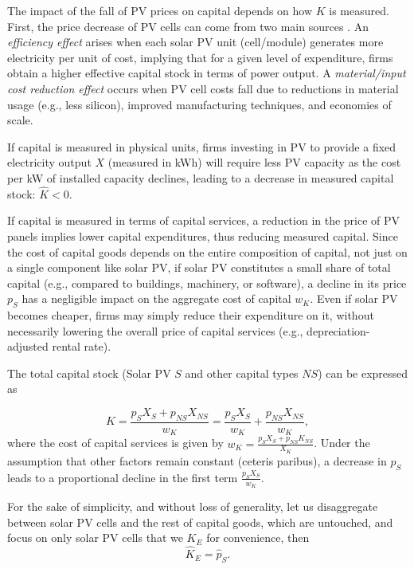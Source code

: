 \documentclass[11pt]{article}
\begin{document}
The impact of the fall of PV prices on capital depends on how $K$ is measured. First, the price decrease of PV cells can come from two main sources \citep{kavlakEvaluatingCausesCost2018}.
An \emph{efficiency effect} arises when each solar PV unit (cell/module) generates more electricity per unit of cost, implying that for a given level of expenditure, firms obtain a higher effective capital stock in terms of power output. A \emph{material/input cost reduction effect} occurs when PV cell costs fall due to reductions in material usage (e.g., less silicon), improved manufacturing techniques, and economies of scale. 

\vspace{3mm}
If capital is measured in physical units, firms investing in PV to provide a fixed electricity output $X$ (measured in kWh) will require less PV capacity as the cost per kW of installed capacity declines, leading to a decrease in measured capital stock: $\hat{K} < 0$. 

If capital is measured in terms of capital services, a reduction in the price of PV panels implies lower capital expenditures, thus reducing measured capital. Since the cost of capital goods depends on the entire composition of capital, not just on a single component like solar PV, if solar PV constitutes a small share of total capital (e.g., compared to buildings, machinery, or software), a decline in its price $p_S$ has a negligible impact on the aggregate cost of capital $w_K$. Even if solar PV becomes cheaper, firms may simply reduce their expenditure on it, without necessarily lowering the overall price of capital services (e.g., depreciation-adjusted rental rate). 

The total capital stock (Solar PV $S$ and other capital types $NS$) can be expressed as 

\begin{equation*}
    K = \frac{p_S X_S + p_{NS} X_{NS}}{w_K}=\frac{p_S X_S}{w_K}+\frac{p_{NS} X_{NS}}{w_K},
\end{equation*} where the cost of capital services is given by $w_K = \frac{p_S X_S + p_{NS} K_{NS}}{X_K}$. Under the assumption that other factors remain constant (ceteris paribus), a decrease in $p_S$ leads to a proportional decline in the first term $\frac{p_S X_S}{w_K}$. 

For the sake of simplicity, and without loss of generality, let us disaggregate between solar PV cells and the rest of capital goods, which are untouched, and focus on only solar PV cells that we $K_E$ for convenience, then
\begin{equation}
\label{eq_elec_capital_stock}
    \hat{K}_E = \hat{p}_S.
\end{equation}
\end{document}
